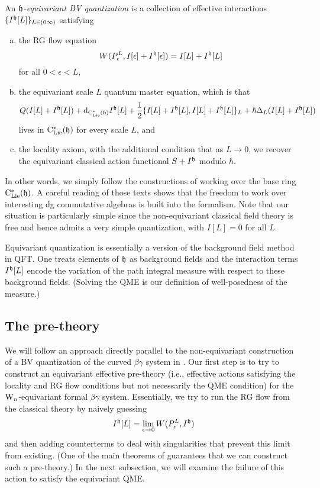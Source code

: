 \begin{dfn} \label{eqQFT} 
An {\em $\mathfrak h$-equivariant BV quantization} is a collection of effective interactions $\{I^\mathfrak h[L]\}_{L \in (0\infty)}$
satisfying
\begin{enumerate}[(a)]
\item the RG flow equation
\[
W(P_\epsilon^L, I[\epsilon]+I^\mathfrak h[\epsilon]) = I[L] + I^\mathfrak h[L]
\]
for all $0 < \epsilon < L$,
\item the equivariant scale $L$ quantum master equation, which is that
\[
Q(I[L]+I^\mathfrak h[L]) + {\rm d}_{{\rm C}_{\rm Lie}^*(\mathfrak h)} I^\mathfrak h[L] + \frac{1}{2}\{I[L]+I^\mathfrak h[L],I[L]+I^\mathfrak h[L]\}_{L} + \hbar \Delta_L(I[L]+I^\mathfrak h[L])
\]
lives in ${\rm C}_{\rm Lie}^*(\mathfrak h)$ for every scale $L$, and
\item the locality axiom, with the additional condition that as $L \to 0$, we recover the equivariant classical action functional $S+ I^\mathfrak h$ modulo $\hbar$.
\end{enumerate}
\end{dfn}

In other words, we simply follow the constructions of \cite{CosBook,CG2} working over the base ring ${\rm C}_{\rm Lie}^*(\mathfrak h)$.
A careful reading of those texts shows that the freedom to work over interesting dg commutative algebras is built into the formalism.
Note that our situation is particularly simple since the non-equivariant classical field theory is free and hence admits a very simple quantization,
with $I[L] = 0$ for all $L$.

\begin{rmk}
Equivariant quantization is essentially a version of the background field method in QFT.
One treats elements of $\mathfrak h$ as background fields and 
the interaction terms $I^\mathfrak h[L]$ encode the variation of the path integral measure with respect to these background fields.
(Solving the QME is our definition of well-posedness of the measure.)
\end{rmk}

\subsection{The pre-theory}
\label{sec prequant}

We will follow an approach directly parallel to the non-equivariant construction of a BV quantization of the curved $\beta\gamma$ system in \cite{WG2}.
Our first step is to try to construct an equivariant effective pre-theory 
(i.e., effective actions satisfying the locality and RG flow conditions but not necessarily the QME condition)
for the ${{\rm W}_n}$-equivariant formal $\beta\gamma$ system.
Essentially, we try to run the RG flow from the classical theory by naively guessing
\[
I^\mathfrak h[L] = \lim_{\epsilon \to 0} W(P^L_\epsilon,I^\mathfrak h)
\]
and then adding counterterms to deal with singularities that prevent this limit from existing.
(One of the main theorems of \cite{CosBook} guarantees that we can construct such a pre-theory.)
In the next subsection, we will examine the failure of this action to satisfy the equivariant QME.

